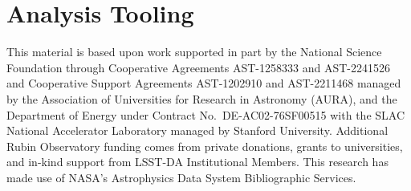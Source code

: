 \documentclass[twocolumn]{aastex7}
\begin{document}








\section{Analysis Tooling}
\label{sec:analysis}







\begin{acknowledgments}
This material is based upon work supported in part by the National Science Foundation through Cooperative Agreements AST-1258333 and AST-2241526 and Cooperative Support Agreements AST-1202910 and AST-2211468 managed by the Association of Universities for Research in Astronomy (AURA), and the Department of Energy under Contract No.\ DE-AC02-76SF00515 with the SLAC National Accelerator Laboratory managed by Stanford University.
Additional Rubin Observatory funding comes from private donations, grants to universities, and in-kind support from LSST-DA Institutional Members.
This research has made use of NASA's Astrophysics Data System Bibliographic Services.
\end{acknowledgments}





\appendix
\twocolumngrid

\end{document}
